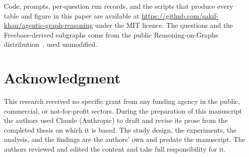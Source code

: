 \documentclass[10pt,twocolumn,a4paper]{article}
\begin{document}
Code, prompts, per-question run records, and the scripts that produce every
table and figure in this paper are available at
\url{https://github.com/sakif-khan/agentic-graph-reasoning} under the MIT
licence. The questions and the Freebase-derived subgraphs come from the public
Reasoning-on-Graphs distribution~\cite{luo2024reasoning}, used unmodified.

\section*{Acknowledgment}

This research received no specific grant from any funding agency in the public,
commercial, or not-for-profit sectors. During the preparation of this manuscript
the authors used Claude (Anthropic) to draft and revise its prose from the
completed thesis on which it is based. The study design, the experiments, the
analysis, and the findings are the authors' own and predate the manuscript. The
authors reviewed and edited the content and take full responsibility for it.



\end{document}
